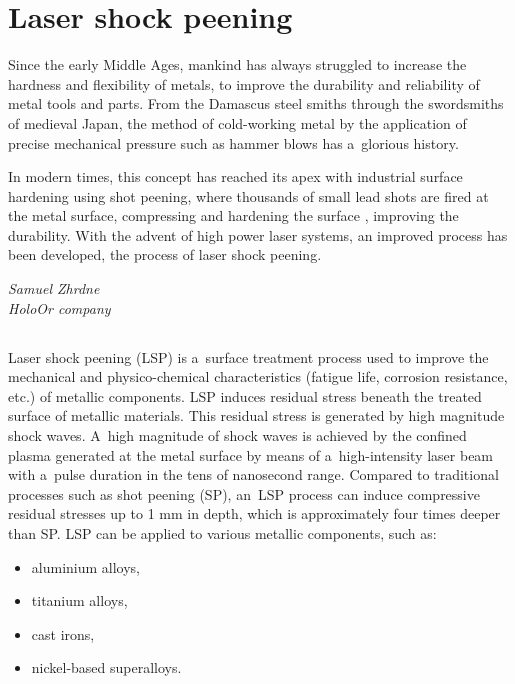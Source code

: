 ﻿\chapter{Laser shock peening \label{chap:peening}}



\epigraph{Since the early Middle Ages, mankind has always struggled to increase the hardness and flexibility of metals, to improve the durability and reliability of  metal tools and parts. From the Damascus steel smiths through the swordsmiths of medieval Japan, the method of cold-working metal by the application of precise mechanical pressure such as hammer blows has a~glorious history.

In modern times, this concept has reached its apex with industrial surface hardening using shot peening, where thousands of small lead shots are fired at the metal surface, compressing and hardening the surface , improving the durability. With the advent of high power laser systems, an improved process has been developed, the process of laser shock peening.}{\textit{Samuel Zhrdne\\ HoloOr company}}


\section*{}

Laser shock peening (LSP) is a~surface treatment process used to improve the mechanical and physico-chemical characteristics (fatigue life, corrosion resistance, etc.) of metallic components. LSP induces residual stress beneath the treated surface of metallic materials. This residual stress is generated by high magnitude shock waves. A~high magnitude of shock waves is achieved by the confined plasma generated at the metal surface by means of a~high-intensity laser beam with a~pulse duration in the tens of nanosecond range. Compared to traditional processes such as shot peening (SP), an~LSP process can induce compressive residual stresses up to 1 mm in depth, which is approximately four times deeper than SP. LSP can be applied to various metallic components, such as:

\begin{itemize}
    \item aluminium alloys,
    \item titanium alloys,
    \item cast irons,
    \item nickel-based superalloys.
\end{itemize}

